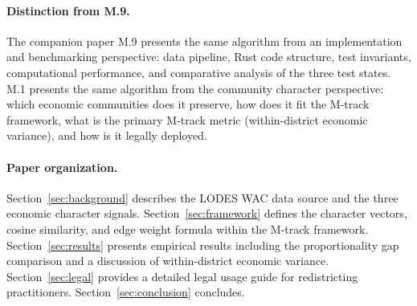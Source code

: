 \paragraph{Distinction from M.9.}
The companion paper M.9 \citep{b27econchar} presents the same algorithm
from an implementation and benchmarking perspective: data pipeline, Rust code
structure, test invariants, computational performance, and comparative analysis
of the three test states.
M.1 presents the same algorithm from the community character perspective:
which economic communities does it preserve, how does it fit the M-track
framework, what is the primary M-track metric (within-district economic
variance), and how is it legally deployed.

\paragraph{Paper organization.}
Section~\ref{sec:background} describes the LODES WAC data source and the
three economic character signals.
Section~\ref{sec:framework} defines the character vectors, cosine similarity,
and edge weight formula within the M-track framework.
Section~\ref{sec:results} presents empirical results including the
proportionality gap comparison and a discussion of within-district economic
variance.
Section~\ref{sec:legal} provides a detailed legal usage guide for redistricting
practitioners.
Section~\ref{sec:conclusion} concludes.
